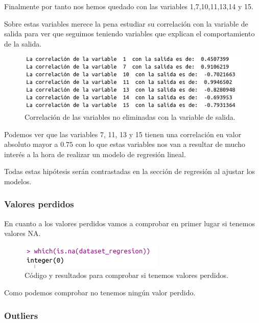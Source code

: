 \documentclass[12pt,a4paper]{article}
\begin{document}
Finalmente por tanto nos hemos quedado con las variables 1,7,10,11,13,14 y 15.

Sobre estas variables merece la pena estudiar su correlación con la variable de salida para ver que seguimos teniendo variables que explican el comportamiento de la salida.

\begin{figure}[H]
	\centering
	\includegraphics[scale=0.6]{./Imagenes/EDA/Regresion/correlacion_variable_salida1.png}
	\caption{Correlación de las variables no eliminadas con la variable de salida.}
\end{figure}

Podemos ver que las variables 7, 11, 13 y 15 tienen una correlación en valor absoluto mayor a $0.75$ con lo que estas variables nos van a resultar de mucho interés a la hora de realizar un modelo de regresión lineal.

Todas estas hipótesis serán contrastadas en la sección de regresión al ajustar los modelos.

\subsubsection{Valores perdidos}

En cuanto a los valores perdidos vamos a comprobar en primer lugar si tenemos valores NA.

\begin{figure}[H]
	\centering
	\includegraphics[scale=0.6]{./Imagenes/EDA/Regresion/valores_perdidos.png}
	\caption{Código y resultados para comprobar si tenemos valores perdidos.}
\end{figure}

Como podemos comprobar no tenemos ningún valor perdido.

\subsubsection{Outliers}
\end{document}

